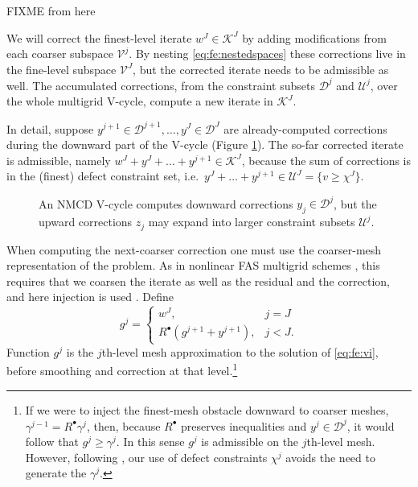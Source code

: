 \documentclass[letterpaper,final,12pt,reqno]{amsart}
\theoremstyle{cstyle}
\theoremstyle{cstyle*}
\theoremstyle{dstyle}
\numberwithin{equation}{section}
\numberwithin{figure}{section}
\numberwithin{table}{section}
\numberwithin{theorem}{section}
\newcommand{\iR}{R^{\bullet}}
\begin{document}
FIXME from here

We will correct the finest-level iterate $w^J\in \mathcal{K}^J$ by adding modifications from each coarser subspace $\mathcal{V}^j$.  By nesting \eqref{eq:fe:nestedspaces} these corrections live in the fine-level subspace $\mathcal{V}^J$, but the corrected iterate needs to be admissible as well.  The accumulated corrections, from the constraint subsets $\mathcal{D}^j$ and $\mathcal{U}^j$, over the whole multigrid V-cycle, compute a new iterate in $\mathcal{K}^J$.

In detail, suppose $y^{j+1} \in \mathcal{D}^{j+1}, \dots, y^J \in \mathcal{D}^J$ are already-computed corrections during the downward part of the V-cycle (Figure \ref{fig:nmcdvcycle}).  The so-far corrected iterate is admissible, namely $w^J + y^J + \dots + y^{j+1} \in \mathcal{K}^J$, because the sum of corrections is in the (finest) defect constraint set, i.e.~$y^J + \dots + y^{j+1} \in \mathcal{U}^J = \{v\ge \chi^J\}$.

\begin{figure}[ht]
\begin{center}

\end{center}
\caption{An NMCD V-cycle computes downward corrections $y_j \in \mathcal{D}^j$, but the upward corrections $z_j$ may expand into larger constraint subsets $\mathcal{U}^j$.}
\label{fig:nmcdvcycle}
\end{figure}

When computing the next-coarser correction one must use the coarser-mesh representation of the problem.  As in nonlinear FAS multigrid schemes \cite{BrandtLivne2011,Bruneetal2015,Trottenbergetal2001}, this requires that we coarsen the iterate as well as the residual and the correction, and here injection is used \cite[section 5.3]{Trottenbergetal2001}.  Define
\begin{equation}
g^j = \begin{cases} w^J, & j=J \\
                    \iR(g^{j+1} + y^{j+1}), & j < J.
      \end{cases}  \label{eq:fe:defineg}
\end{equation}
Function $g^j$ is the $j$th-level mesh approximation to the solution of \eqref{eq:fe:vi}, before smoothing and correction at that level.\footnote{If we were to inject the finest-mesh obstacle downward to coarser meshes, $\gamma^{j-1} = \iR \gamma^j$, then, because $\iR$ preserves inequalities and $y^j \in \mathcal{D}^j$, it would follow that $g^j \ge \gamma^j$.  In this sense $g^j$ is admissible on the $j$th-level mesh.  However, following \cite{GraeserKornhuber2009}, our use of defect constraints $\chi^j$ avoids the need to generate the $\gamma^j$.}
\end{document}
